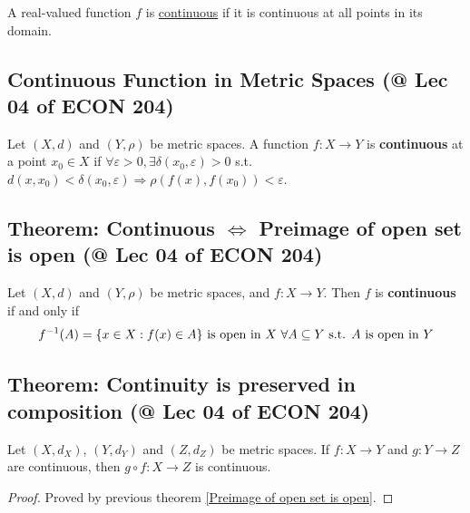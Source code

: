 \documentclass[11pt]{elegantbook}
\begin{document}
\begin{definition}
    \normalfont
    A real-valued function $f$ is \underline{continuous} if it is continuous at all points in its domain.
\end{definition}

\subsection{Continuous Function in Metric Spaces \small{(@ Lec 04 of ECON 204)}}
\begin{definition}
\normalfont
    Let $(X, d)$ and $(Y, \rho)$ be metric spaces. A function $f : X \rightarrow Y$ is \textbf{continuous} at a point $x_0 \in X$ if $\forall \varepsilon > 0, \exists \delta(x_0, \varepsilon) > 0$ s.t. $d(x, x_0) < \delta(x_0, \varepsilon) \Rightarrow  \rho(f(x), f(x_0)) < \varepsilon$.
\end{definition}

\subsection{Theorem: Continuous $\Leftrightarrow$ Preimage of open set is open \small{(@ Lec 04 of ECON 204)}}
\begin{theorem}\label{Preimage of open set is open}
    Let $(X, d)$ and $(Y, \rho)$ be metric spaces, and $f : X \rightarrow Y$. Then $f$ is \textbf{continuous} if and only if
    $$f^{-1}(A)=\{x\in X: f(x)\in A\} \textnormal{ is open in $X$ $\forall A\subseteq Y$ s.t. $A$ is open in $Y$}$$
\end{theorem}

\subsection{Theorem: Continuity is preserved in composition \small{(@ Lec 04 of ECON 204)}}
\begin{theorem}
    Let $(X, d_X)$, $(Y, d_Y)$ and $(Z, d_Z)$ be metric spaces. If $f : X \rightarrow Y$ and $g : Y \rightarrow Z$ are continuous, then $g \circ f : X \rightarrow Z$ is
    continuous.
\end{theorem}
\begin{proof}
    Proved by previous theorem \ref{Preimage of open set is open}.
\end{proof}
\end{document}
